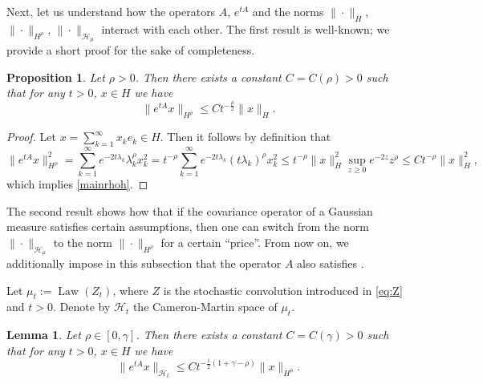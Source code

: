\documentclass[11pt,a4paper]{article}
\renewcommand{\H}{\mathcal{H}}
\renewcommand{\ge}{\geqslant}
\renewcommand{\le}{\leqslant}
\newcommand{\CM}{\H_\mu}
\numberwithin{equation}{section}
\DeclareMathOperator{\law}{Law}%
\let\cref\crtcref
\theoremstyle{definition}
\theoremstyle{remark}
\theoremstyle{plain}
\newtheorem{lemma}[definition]{Lemma}
\newtheorem{proposition}[definition]{Proposition}
\begin{document}
Next, let us understand how the operators $A$,  $e^{t A}$ and the norms $\|\cdot\|_{H}$, $\|\cdot\|_{H^\rho}$, $\|\cdot\|_{\CM}$ interact with each other. The first result is well-known; we provide a short proof for the sake of completeness.
\begin{proposition}\label{p:basic}
Let $\rho>0$. Then there exists a constant $C=C(\rho)>0$ such that for any $t>0$, $x\in H$ we have
\begin{equation}\label{mainrhoh}
\|e^{t A} x\|_{H^\rho}\le C t^{-\frac\rho2}\|x\|_H.
\end{equation}
\end{proposition}
\begin{proof}
Let $x=\sum_{k=1}^\infty x_k e_k\in H$. Then it follows by definition that
\begin{equation*}
\|e^{t A} x\|^2_{H^\rho}=\sum_{k=1}^\infty e^{-2 t \lambda_k}\lambda_k^\rho x_k^2= t^{-\rho}\sum_{k=1}^\infty e^{-2 t \lambda_k}(t\lambda_k)^\rho x_k^2\le t^{-\rho}\|x\|^2_H \sup_{z\ge0} e^{-2z}z^\rho\le C t^{-\rho}\|x\|^2_H,
\end{equation*}
which implies \eqref{mainrhoh}.
\end{proof}

The second result shows how that if the covariance operator of a Gaussian measure satisfies certain assumptions, then one can switch from the norm  $\|\cdot\|_{\CM}$ to the norm $\|\cdot\|_{H^\rho}$ for a certain ``price''. From now on, we additionally impose in this subsection that   the operator $A$ also satisfies \cref{ass:lambdagamma}.


Let $\mu_t:=\law(Z_t)$, where $Z$ is the stochastic convolution introduced in \eqref{eq:Z} and $t>0$.  Denote by $\H_t$ the Cameron-Martin space of $\mu_t$. 
\begin{lemma}\label{l:cmbound}
Let $\rho\in[0,\gamma]$.
Then there exists a constant $C=C(\gamma)>0$ such that for any $t>0$, $x\in H$ we have
\begin{equation}\label{maincm}
\|e^{t A} x\|_{\H_{t}}\le C t^{-\frac12(1+\gamma-\rho)}\|x\|_{H^\rho}.
\end{equation}
\end{lemma}
\end{document}
